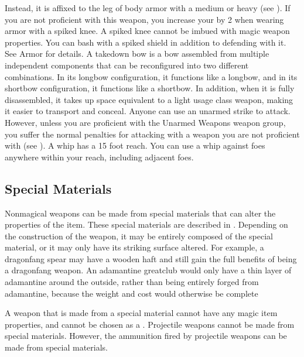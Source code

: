         Instead, it is affixed to the leg of body armor with a medium or heavy  (see ).
        If you are not proficient with this weapon, you increase your  by 2 when wearing armor with a spiked knee.
        A spiked knee cannot be imbued with magic weapon properties.
         You can bash with a spiked shield in addition to defending with it. See Armor for details.
         A takedown bow is a bow assembled from multiple independent components that can be reconfigured into two different combinations.
        In its longbow configuration, it functions like a longbow, and in its shortbow configuration, it functions like a shortbow.
        In addition, when it is fully disassembled, it takes up space equivalent to a light usage class weapon, making it easier to transport and conceal.
         Anyone can use an unarmed strike to attack.
        However, unless you are proficient with the Unarmed Weapons weapon group, you suffer the normal penalties for attacking with a weapon you are not proficient with (see ).
         A whip has a 15 foot reach.
        You can use a whip against foes anywhere within your reach, including adjacent foes.

    \subsection{Special Materials}\label{Special Materials}
        Nonmagical weapons can be made from special materials that can alter the properties of the item.
        These special materials are described in .
        Depending on the construction of the weapon, it may be entirely composed of the special material, or it may only have its striking surface altered.
        For example, a dragonfang spear may have a wooden haft and still gain the full benefits of being a dragonfang weapon.
        An adamantine greatclub would only have a thin layer of adamantine around the outside, rather than being entirely forged from adamantine, because the weight and cost would otherwise be complete

        A weapon that is made from a special material cannot have any magic item properties, and cannot be chosen as a .
        Projectile weapons cannot be made from special materials.
        However, the ammunition fired by projectile weapons can be made from special materials.

